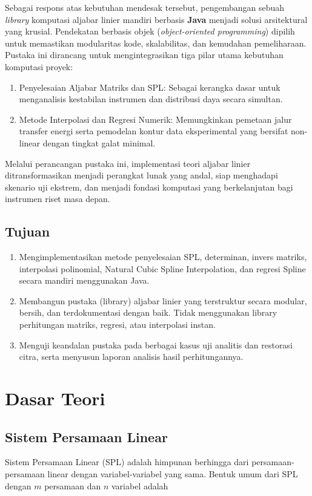 \documentclass[12pt,a4paper]{report}
\begin{document}
Sebagai respons atas kebutuhan mendesak tersebut, pengembangan sebuah \textit{library} komputasi aljabar linier mandiri berbasis \textbf{Java} menjadi solusi arsitektural yang krusial. Pendekatan berbasis objek (\textit{object-oriented programming}) dipilih untuk memastikan modularitas kode, skalabilitas, dan kemudahan pemeliharaan. Pustaka ini dirancang untuk mengintegrasikan tiga pilar utama kebutuhan komputasi proyek:

\begin{enumerate}
    \item{Penyelesaian Aljabar Matriks dan SPL:} Sebagai kerangka dasar untuk menganalisis kestabilan instrumen dan distribusi daya secara simultan.
    \item{Metode Interpolasi dan Regresi Numerik:} Memungkinkan pemetaan jalur transfer energi serta pemodelan kontur data eksperimental yang bersifat non-linear dengan tingkat galat minimal.
\end{enumerate}

Melalui perancangan pustaka ini, implementasi teori aljabar linier ditransformasikan menjadi perangkat lunak yang andal, siap menghadapi skenario uji ekstrem, dan menjadi fondasi komputasi yang berkelanjutan bagi instrumen riset masa depan.

\section{Tujuan}
\begin{enumerate}
    \item Mengimplementasikan metode penyelesaian SPL, determinan, invers matriks, interpolasi polinomial, Natural Cubic Spline Interpolation, dan regresi Spline secara mandiri menggunakan Java.
    \item Membangun pustaka (library) aljabar linier yang terstruktur secara modular, bersih, dan terdokumentasi dengan baik. Tidak menggunakan library perhitungan matriks, regresi, atau interpolasi instan.
    \item Menguji keandalan pustaka pada berbagai kasus uji analitis dan restorasi citra, serta menyusun laporan analisis hasil perhitungannya.
 \end{enumerate}
 
\chapter{Dasar Teori}

\section{Sistem Persamaan Linear}
Sistem Persamaan Linear (SPL) adalah himpunan berhingga dari persamaan-persamaan linear dengan variabel-variabel yang sama. Bentuk umum dari SPL dengan $m$ persamaan dan $n$ variabel adalah
\end{document}
